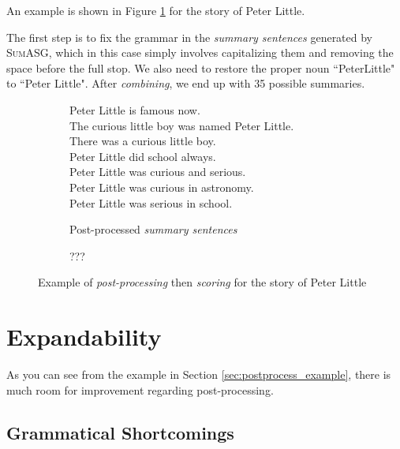An example is shown in Figure \ref{fig:postprocess_score_example} for the story of Peter Little.

The first step is to fix the grammar in the \textit{summary sentences} generated by \textsc{SumASG}, which in this case simply involves capitalizing them and removing the space before the full stop. We also need to restore the proper noun ``PeterLittle" to ``Peter Little". After \textit{combining}, we end up with 35 possible summaries.

\begin{figure}[H]
\begin{subfigure}{\textwidth}
\begin{displayquote}
Peter Little is famous now.\\
The curious little boy was named Peter Little.\\
There was a curious little boy.\\
Peter Little did school always.\\
Peter Little was curious and serious.\\
Peter Little was curious in astronomy.\\
Peter Little was serious in school.
\end{displayquote}
\caption{Post-processed \textit{summary sentences}}
\end{subfigure}
\begin{subfigure}{\textwidth}
\vspace{\baselineskip}
\begin{displayquote}

\end{displayquote}
\caption{???}
\end{subfigure}
\caption{Example of \textit{post-processing} then \textit{scoring} for the story of Peter Little}
\label{fig:postprocess_score_example}
\end{figure}

\section{Expandability}

As you can see from the example in Section \ref{sec:postprocess_example}, there is much room for improvement regarding post-processing.

\subsection{Grammatical Shortcomings}

